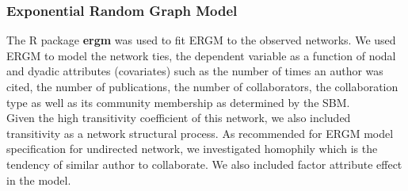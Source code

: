 \subsubsection{Exponential Random Graph Model}
\label{sec:methods_ergm}
The R package \textbf{ergm} \cite{HandcockERGMFitsimulate2003,HunterergmPackageFit2008} was used to fit ERGM to the observed networks. We used ERGM to model the network ties, the dependent variable as a function of nodal and dyadic attributes (covariates) such as the number of times an author was cited, the number of publications, the number of collaborators, the collaboration type as well as its community membership as determined by the SBM. \\
Given the high transitivity coefficient of this network, we also included transitivity as a network structural process. As recommended for ERGM model specification for undirected network, we investigated homophily which is the tendency of similar author to collaborate. We also included factor attribute effect in the model. \\
